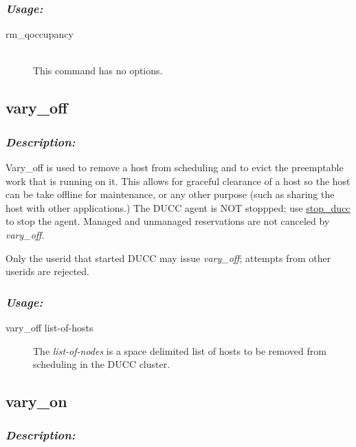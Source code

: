     \subsubsection{\em Usage:}

    \begin{description}
      \item[rm\_qoccupancy] \hfill \\ 
        This command has no options.
      \end{description}
             
       

\subsection{vary\_off}
\label{subsec:admin.vary-off}
    \subsubsection{{\em Description:}}

    Vary\_off is used to remove a host from scheduling and to evict the preemptable work that is running on it.
    This allows for graceful clearance of a host so the host can be take offline for maintenance,
    or any other purpose (such as sharing the host with other applications.)  
    The DUCC agent is NOT stoppped; use \hyperref[subsec:admin.stop-ducc]{stop\_ducc} to stop the
    agent.  
    Managed and unmanaged reservations are not canceled by {\em vary\_off}.
    
    Only the userid that started DUCC may issue {\em vary\_off}; attempts from other userids
    are rejected.

    \subsubsection{\em{Usage: }}

        \begin{description} 
          \item[vary\_off list-of-hosts]
            The {\em list-of-nodes} is a space delimited list of hosts to be removed from
              scheduling in the DUCC cluster.
        \end{description}
            
\subsection{vary\_on}
\label{subsec:admin.vary-on}
    \subsubsection{{\em Description:}}

